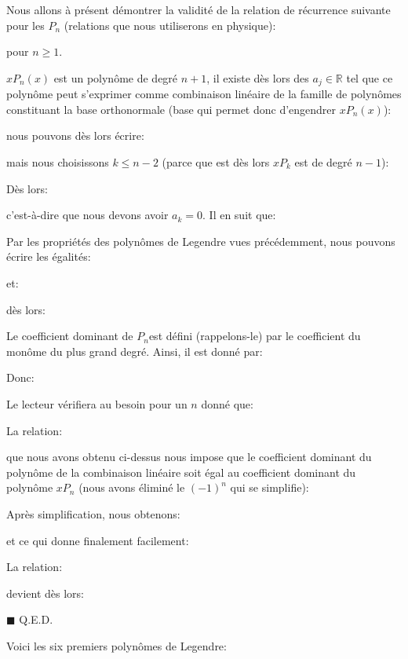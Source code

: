 	\begin{theorem}
	Nous allons à présent démontrer la validité de la relation de récurrence suivante pour les $P_n$ (relations que nous utiliserons en physique):
	
	pour $n \geq 1$.
	\end{theorem}
	\begin{dem}
	$xP_n(x)$ est un polynôme de degré $n+1$, il existe dès lors des $a_j\in \mathbb{R}$ tel que ce polynôme peut s'exprimer comme combinaison linéaire de la famille de polynômes constituant la base orthonormale (base qui permet donc d'engendrer $xP_n(x)$):
	
	nous pouvons dès lors écrire:
	
	mais nous choisissons $k\leq n-2$ (parce que est dès lors $xP_k$ est de degré $n-1$):
	
	Dès lors:
	
	c'est-à-dire que nous devons avoir $a_k=0$. Il en suit que:
	
	Par les propriétés des polynômes de Legendre vues précédemment, nous pouvons écrire les égalités:
	
	et:
	
	dès lors:
	
	Le coefficient dominant de  $P_n$est défini (rappelons-le) par le coefficient du monôme du plus grand degré. Ainsi, il est donné par:
	
	Donc:
	
	\begin{tcolorbox}[title=Remarque,colframe=black,arc=10pt]
	Le lecteur vérifiera au besoin pour un $n$ donné que: 
	
	\end{tcolorbox}
	La relation:
	
	que nous avons obtenu ci-dessus nous impose que le coefficient dominant du polynôme de la combinaison linéaire soit égal au coefficient dominant du polynôme $xP_n$ (nous avons éliminé le $(-1)^n$ qui se simplifie):
	
	Après simplification, nous obtenons:
	
	et ce qui donne finalement facilement:
	
	La relation:
	
	devient dès lors:
		
	\begin{flushright}
		$\blacksquare$  Q.E.D.
	\end{flushright}
	\end{dem}
	Voici les six premiers polynômes de Legendre:
	
